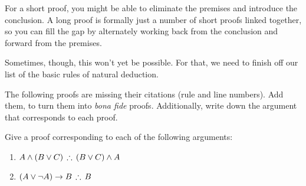 For a short proof, you might be able to eliminate the premises and introduce the conclusion. A long proof is formally just a number of short proofs linked together, so you can fill the gap by alternately working back from the conclusion and forward from the premises.

Sometimes, though, this won't yet be possible. For that, we need to finish off our list of the basic rules of natural deduction.



\begin{practiceproblems}

%

\problempart
The following proofs are missing their citations (rule and line numbers). Add them, to turn them into \emph{bona fide} proofs. Additionally, write down the argument that corresponds to each proof.

\begin{fitchproof}
\end{fitchproof}

\solutions
\problempart
\label{pr.solvedTFLproofs}
Give a proof corresponding to each of the following arguments:
\begin{enumerate}
\item $A\eand (B\eor C)\,\therefore\,(B\eor C)\eand A$
\item $(A\eor\enot A)\eif B\,\therefore\, B$
\end{enumerate}



\end{practiceproblems}



